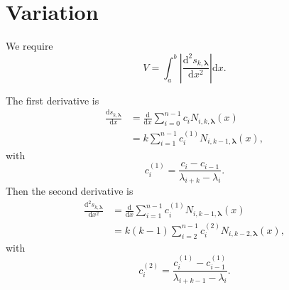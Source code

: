 \documentclass{article}
\renewcommand{\vec}[1]{\bm{#1}}
\newcommand{\md}{\mathrm{d}}
\begin{document}
\section{Variation}

We require
\begin{equation}
  V
  = \int_a^b \left|\frac{\md^2 s_{k, \vec{\lambda}}}{\md x^2}\right|
  \md x.
\end{equation}

The first derivative is
\begin{equation}
  \begin{split}
    \frac{\md s_{k, \vec{\lambda}}}{\md x}
    &= \frac{\md}{\md x} \sum_{i=0}^{n-1} c_i
    N_{i, k, \vec{\lambda}}(x)
    \\
    &= k \sum_{i=1}^{n-1} c_i^{(1)} N_{i, k-1, \vec{\lambda}}(x),
  \end{split}
\end{equation}
with
\begin{equation}
  c_i^{(1)} = \frac{c_i - c_{i-1}}{\lambda_{i+k} - \lambda_i}.
\end{equation}
Then the second derivative is
\begin{equation}
  \begin{split}
    \frac{\md^2 s_{k, \vec{\lambda}}}{\md x^2}
    &= \frac{\md}{\md x} \sum_{i=1}^{n-1} c_i^{(1)}
    N_{i, k-1, \vec{\lambda}}(x)
    \\
    &= k (k - 1) \sum_{i=2}^{n-1} c_i^{(2)}
    N_{i, k-2, \vec{\lambda}}(x),
  \end{split}
\end{equation}
with
\begin{equation}
  c_i^{(2)} =
  \frac{c_i^{(1)} - c_{i-1}^{(1)}}
  {\lambda_{i+k-1} - \lambda_i}.
\end{equation}


\printbibliography
\end{document}
